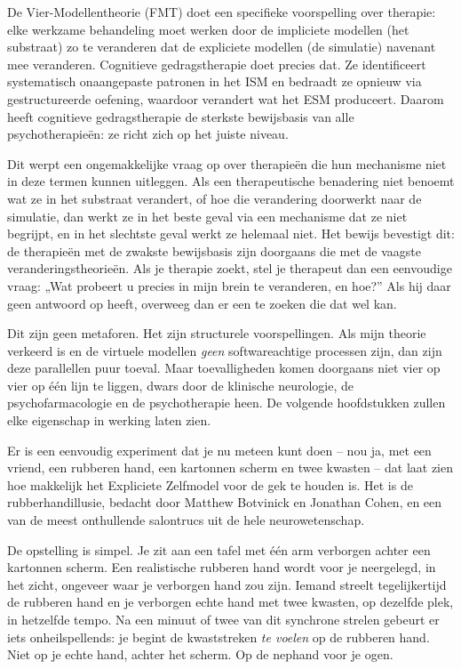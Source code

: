 \documentclass[11pt, twoside, openright]{book}
\begin{document}
De Vier-Modellentheorie (FMT) doet een specifieke voorspelling over therapie: elke werkzame behandeling moet werken door de impliciete modellen (het substraat) zo te veranderen dat de expliciete modellen (de simulatie) navenant mee veranderen. Cognitieve gedragstherapie doet precies dat. Ze identificeert systematisch onaangepaste patronen in het ISM en bedraadt ze opnieuw via gestructureerde oefening, waardoor verandert wat het ESM produceert. Daarom heeft cognitieve gedragstherapie de sterkste bewijsbasis van alle psychotherapieën: ze richt zich op het juiste niveau.

Dit werpt een ongemakkelijke vraag op over therapieën die hun mechanisme niet in deze termen kunnen uitleggen. Als een therapeutische benadering niet benoemt wat ze in het substraat verandert, of hoe die verandering doorwerkt naar de simulatie, dan werkt ze in het beste geval via een mechanisme dat ze niet begrijpt, en in het slechtste geval werkt ze helemaal niet. Het bewijs bevestigt dit: de therapieën met de zwakste bewijsbasis zijn doorgaans die met de vaagste veranderingstheorieën. Als je therapie zoekt, stel je therapeut dan een eenvoudige vraag: „Wat probeert u precies in mijn brein te veranderen, en hoe?” Als hij daar geen antwoord op heeft, overweeg dan er een te zoeken die dat wel kan.

Dit zijn geen metaforen. Het zijn structurele voorspellingen. Als mijn theorie verkeerd is en de virtuele modellen \textit{geen} softwareachtige processen zijn, dan zijn deze parallellen puur toeval. Maar toevalligheden komen doorgaans niet vier op vier op één lijn te liggen, dwars door de klinische neurologie, de psychofarmacologie en de psychotherapie heen. De volgende hoofdstukken zullen elke eigenschap in werking laten zien.

Er is een eenvoudig experiment dat je nu meteen kunt doen -- nou ja, met een vriend, een rubberen hand, een kartonnen scherm en twee kwasten -- dat laat zien hoe makkelijk het Expliciete Zelfmodel voor de gek te houden is. Het is de rubberhandillusie, bedacht door Matthew Botvinick en Jonathan Cohen, en een van de meest onthullende salontrucs uit de hele neurowetenschap.

De opstelling is simpel. Je zit aan een tafel met één arm verborgen achter een kartonnen scherm. Een realistische rubberen hand wordt voor je neergelegd, in het zicht, ongeveer waar je verborgen hand zou zijn. Iemand streelt tegelijkertijd de rubberen hand en je verborgen echte hand met twee kwasten, op dezelfde plek, in hetzelfde tempo. Na een minuut of twee van dit synchrone strelen gebeurt er iets onheilspellends: je begint de kwaststreken \textit{te voelen} op de rubberen hand. Niet op je echte hand, achter het scherm. Op de nephand voor je ogen.
\end{document}

